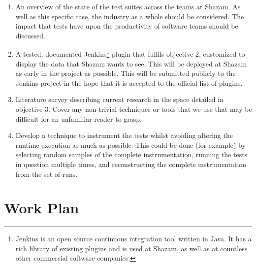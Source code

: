 \begin{enumerate}
	\item{
		An overview of the state of the test suites across the teams at Shazam. As
		well as this specific case, the industry as a whole should be considered.
		The impact that \flaky tests have upon the productivity of software teams
		should be discussed.
	}
	\item{
		A tested, documented Jenkins\footnote{Jenkins is an open source continuous
		integration tool written in Java. It has a rich library of existing plugins
		and is used at Shazam, as well as at countless other commercial software
		companies.} plugin that fulfils objective 2, customized to display the data
		that Shazam wants to see. This will be deployed at Shazam as early in the
		project as possible. This will be submitted publicly to the Jenkins project
		in the hope that it is accepted to the official list of plugins.
	}
	\item{
		Literature survey describing current research in the space detailed in
		objective 3. Cover any non-trivial techniques or tools that we use that may
		be difficult for an unfamiliar reader to grasp.
	}
	\item{
		Develop a technique to instrument the \flaky tests whilst avoiding altering
		the runtime execution as much as possible. This could be done (for example)
		by selecting random samples of the complete instrumentation, running the
		tests in question multiple times, and reconstructing the complete
		instrumentation from the set of runs.
	}
\end{enumerate}

\tocless\section{Work Plan}

